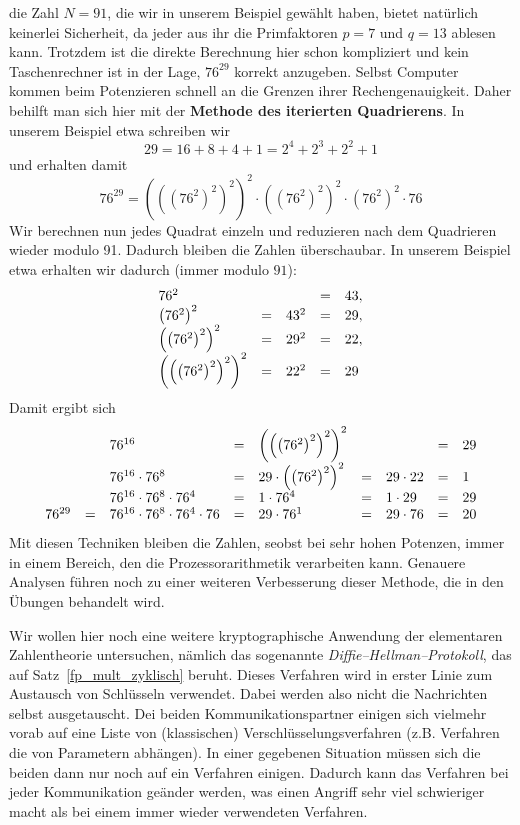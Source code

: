 \begin{notiz} die Zahl $N = 91$, die wir in unserem Beispiel gewählt haben, bietet natürlich keinerlei 
Sicherheit, da jeder aus ihr die Primfaktoren $p = 7$ und $q = 13$ ablesen kann. Trotzdem ist die direkte 
Berechnung hier schon kompliziert und kein Taschenrechner ist in der Lage, $76^{29}$ korrekt anzugeben. Selbst 
Computer kommen beim Potenzieren schnell an die Grenzen ihrer Rechengenauigkeit. Daher behilft man sich hier 
mit der \textbf{Methode des iterierten Quadrierens}. In unserem Beispiel etwa schreiben wir 
  	$$ 29 = 16 + 8 + 4 + 1 = 2^4 + 2^3 + 2^2 + 1 $$
und erhalten damit 
  	$$ 76^{29} = \left(\left(\left( 76^2 \right)^2\right)^2\right)^2 \cdot \left(\left( 76^2 \right)^2\right)^2
	\cdot \left( 76^2 \right)^2 \cdot 76 $$
Wir berechnen nun jedes Quadrat einzeln und reduzieren nach dem Quadrieren wieder modulo 91. Dadurch bleiben 
die Zahlen überschaubar. In unserem Beispiel etwa erhalten wir dadurch (immer modulo $91$): 
  	$$ \begin{array} {l c l c l}
	76^2 & & & = & 43, \\ 
	\left( 76^2 \right)^2 & = & 43^2 & = &  29, \\ 
	\left(\left( 76^2 \right)^2\right)^2 & = & 29^2 & = & 22, \\ 
  	\left(\left(\left( 76^2 \right)^2\right)^2\right)^2 & = & 22^2 & = & 29 
	\end{array} $$
Damit ergibt sich
	$$ \begin{array} {l c l c l c l c l }
	& & 76^{16} & = & \left(\left(\left( 76^2 \right)^2\right)^2\right)^2 & & & = & 29 \\
	& & 76^{16} \cdot 76^{8} & = & 29 \cdot \left(\left( 76^2 \right)^2\right)^2 & = & 29 \cdot 22 & = & 1 \\
	& & 76^{16} \cdot 76^{8} \cdot 76^{4} &=& 1 \cdot 76^4 & = & 1 \cdot 29 & = & 29 \\
	76^{29} & = &  76^{16} \cdot 76^{8} \cdot 76^{4} \cdot 76 & = & 29 \cdot 76^1 & = & 29 \cdot 76 &  = & 20 \\
	\end{array} $$ 
Mit diesen Techniken bleiben die Zahlen, seobst bei sehr hohen Potenzen, immer in einem Bereich, den die 
Prozessorarithmetik verarbeiten kann. Genauere Analysen führen noch zu einer weiteren Verbesserung dieser 
Methode, die in den Übungen behandelt wird. 
\end{notiz}

\bigbreak
\bigbreak

Wir wollen hier noch eine weitere kryptographische Anwendung der elementaren Zahlentheorie untersuchen, nämlich 
das sogenannte \textit{Diffie--Hellman--Protokoll}, das auf Satz~\ref{fp_mult_zyklisch} beruht. Dieses Verfahren wird 
in erster Linie zum Austausch von Schlüsseln verwendet. Dabei werden also nicht die Nachrichten selbst ausgetauscht. 
Dei beiden Kommunikationspartner einigen sich vielmehr vorab auf eine Liste von (klassischen) 
Verschlüsselungsverfahren (z.B. Verfahren die von Parametern abhängen). In einer gegebenen Situation müssen 
sich die beiden dann nur noch auf ein Verfahren einigen. Dadurch kann das Verfahren bei jeder Kommunikation 
geänder werden, was einen Angriff sehr viel schwieriger macht als bei einem immer wieder verwendeten Verfahren.

